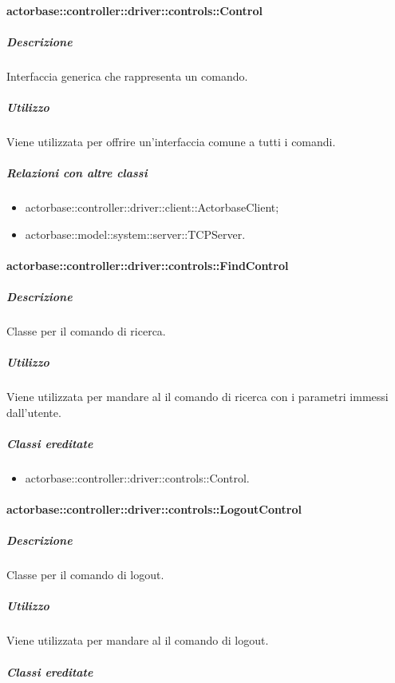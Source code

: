 \documentclass{scalatekids-article}
\begin{document}
\paragraph{actorbase::controller::driver::controls::Control}

\subparagraph{Descrizione}

Interfaccia generica che rappresenta un comando.

\subparagraph{Utilizzo}

Viene utilizzata per offrire un'interfaccia comune a tutti i comandi.

\subparagraph{Relazioni con altre classi}

\begin{itemize}
\item actorbase::controller::driver::client::ActorbaseClient;
\item actorbase::model::system::server::TCPServer.
\end{itemize}

\paragraph{actorbase::controller::driver::controls::FindControl}

\subparagraph{Descrizione}

Classe per il comando di ricerca.

\subparagraph{Utilizzo}

Viene utilizzata per mandare al  il comando di ricerca con i parametri immessi dall'utente.

\subparagraph{Classi ereditate}

\begin{itemize}
\item actorbase::controller::driver::controls::Control.
\end{itemize}

\paragraph{actorbase::controller::driver::controls::LogoutControl}

\subparagraph{Descrizione}

Classe per il comando di logout.

\subparagraph{Utilizzo}

Viene utilizzata per mandare al  il comando di logout.

\subparagraph{Classi ereditate}
\end{document}
